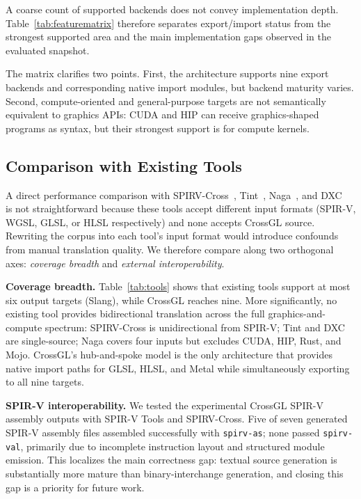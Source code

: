 \documentclass{svproc}
\begin{document}
A coarse count of supported backends does not convey implementation depth. Table~\ref{tab:featurematrix} therefore separates export/import status from the strongest supported area and the main implementation gaps observed in the evaluated snapshot.

The matrix clarifies two points. First, the architecture supports nine export backends and corresponding native import modules, but backend maturity varies. Second, compute-oriented and general-purpose targets are not semantically equivalent to graphics APIs: CUDA and HIP can receive graphics-shaped programs as syntax, but their strongest support is for compute kernels.

\subsection{Comparison with Existing Tools}

A direct performance comparison with SPIRV-Cross~\cite{khronos2023spirvcross}, Tint~\cite{google2023tint}, Naga~\cite{mozilla2023naga}, and DXC~\cite{microsoft2023dxc} is not straightforward because these tools accept different input formats (SPIR-V, WGSL, GLSL, or HLSL respectively) and none accepts CrossGL source. Rewriting the corpus into each tool's input format would introduce confounds from manual translation quality. We therefore compare along two orthogonal axes: \emph{coverage breadth} and \emph{external interoperability}.

\textbf{Coverage breadth.} Table~\ref{tab:tools} shows that existing tools support at most six output targets (Slang), while CrossGL reaches nine. More significantly, no existing tool provides bidirectional translation across the full graphics-and-compute spectrum: SPIRV-Cross is unidirectional from SPIR-V; Tint and DXC are single-source; Naga covers four inputs but excludes CUDA, HIP, Rust, and Mojo. CrossGL's hub-and-spoke model is the only architecture that provides native import paths for GLSL, HLSL, and Metal while simultaneously exporting to all nine targets.

\textbf{SPIR-V interoperability.} We tested the experimental CrossGL SPIR-V assembly outputs with SPIR-V Tools and SPIRV-Cross. Five of seven generated SPIR-V assembly files assembled successfully with \texttt{spirv-as}; none passed \texttt{spirv-val}, primarily due to incomplete instruction layout and structured module emission. This localizes the main correctness gap: textual source generation is substantially more mature than binary-interchange generation, and closing this gap is a priority for future work.
\end{document}
